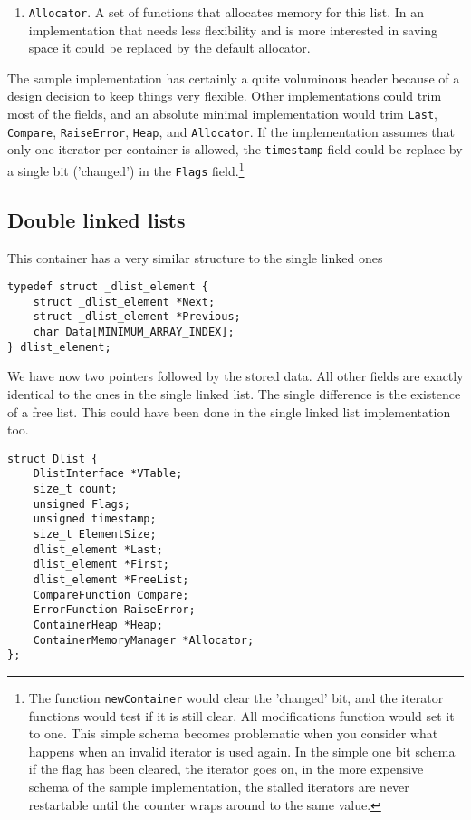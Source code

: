 \documentclass[12pt,a4paper]{memoir} %
\begin{document}
{{\begin{enumerate}
\item \texttt{Allocator}. A set of functions that allocates memory for this list. In an implementation that needs less flexibility and is more interested in saving space it could be replaced by the default allocator.
\end{enumerate}
The sample implementation has certainly a quite voluminous header because of a design decision to keep things very flexible. Other implementations could trim most of the fields, and an absolute minimal implementation would trim \texttt{Last}, \texttt{Compare}, \texttt{RaiseError}, \texttt{Heap}, and \texttt{Allocator}. If the implementation assumes that only one iterator per container is allowed, the \texttt{timestamp} field could be replace by a single bit ('changed') in the \texttt{Flags} field.\footnote{The function \texttt{newContainer} would clear the 'changed' bit, and the iterator functions would test if it is still clear. All modifications function would set it to one. This simple schema becomes problematic when you consider what happens when an invalid iterator is used again. In the simple one bit schema if the flag has been cleared, the iterator goes on, in the more expensive schema of the sample  implementation, the stalled iterators are never restartable until the counter wraps around to the same value.}
\subsection{Double linked lists}
This container has a very similar structure to the single linked ones
\begin{verbatim}
typedef struct _dlist_element {
    struct _dlist_element *Next;
	struct _dlist_element *Previous;
    char Data[MINIMUM_ARRAY_INDEX];
} dlist_element;
\end{verbatim}
We have now two pointers followed by the stored data. All other fields are exactly identical to the ones in the single linked list. The single difference is the existence of a free list. This could have been done in the single linked list implementation too.
\begin{verbatim}
struct Dlist {
    DlistInterface *VTable;
    size_t count;        
    unsigned Flags;
    unsigned timestamp;
    size_t ElementSize;
    dlist_element *Last; 
    dlist_element *First;
    dlist_element *FreeList;
    CompareFunction Compare;
    ErrorFunction RaiseError; 
	ContainerHeap *Heap;
	ContainerMemoryManager *Allocator;
};
\end{verbatim}

}}
\end{document}

